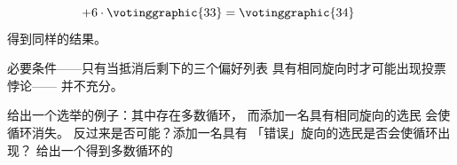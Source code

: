 \begin{exercises}
\begin{answer}
\begin{equation*}
        +6\cdot\votinggraphic{33}
        = \votinggraphic{34}
      \tag*{}\end{equation*}
       得到同样的结果。
    \end{answer}
  \item \label{exer:VoterCondNotSuff} 
    必要条件——只有当抵消后剩下的三个偏好列表
    具有相同旋向时才可能出现投票悖论——
    并不充分。 
    \begin{exparts}
      \partsitem 给出一个选举的例子：其中存在多数循环，
        而添加一名具有相同旋向的选民
        会使循环消失。
      \partsitem 反过来是否可能？添加一名具有
        「错误」旋向的选民是否会使循环出现？
      \partsitem 给出一个得到多数循环的

\end{exparts}
\end{exercises}
